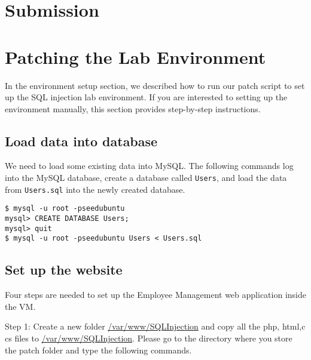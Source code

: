 \section{Submission}

\seedsubmission





\appendix

\section{Patching the Lab Environment}

In the environment setup section, we described how to run 
our patch script to set up the SQL injection lab environment. 
If you are interested to setting up the environment manually, 
this section provides step-by-step instructions. 

\subsection{Load data into database}

We need to load some existing data into MySQL. 
The following commands log into the MySQL database, create a database
called \texttt{Users}, and load the data from {\tt Users.sql} into 
the newly created database. 


\begin{lstlisting}[frame=single, caption={}, label=label]
$ mysql -u root -pseedubuntu
mysql> CREATE DATABASE Users;
mysql> quit
$ mysql -u root -pseedubuntu Users < Users.sql
\end{lstlisting}






\subsection{Set up the website}

Four steps are needed to set up the Employee Management web application
inside the VM.


\noindent
Step 1: Create a new folder \url{/var/www/SQLInjection} and copy all the 
php, html,c cs files to \url{/var/www/SQLInjection}. Please go to the
directory where you store the patch folder and
type the following commands. 
 
